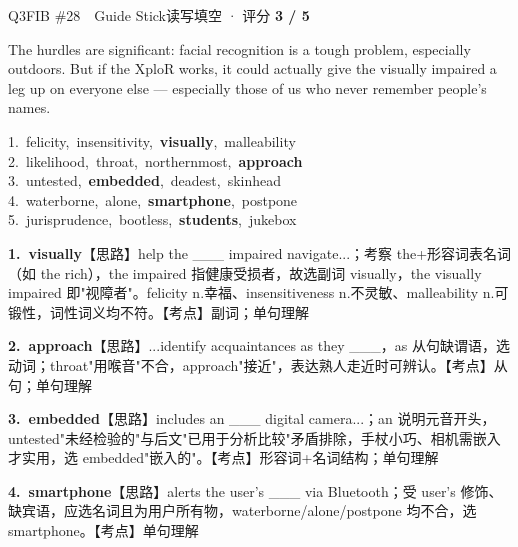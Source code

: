 \begin{qblock}{Q3\quad FIB \#28\ \ Guide Stick}{读写填空 · 评分 \textcolor{cAccent}{\bfseries 3 / 5}}
\begin{promptbox}
The hurdles are significant: facial recognition is a tough problem, especially outdoors. But if the XploR works, it could actually give the visually impaired a leg up on everyone else --- especially those of us who never remember people's names.
\end{promptbox}
{\small
1.\ felicity,\ insensitivity,\ \textbf{visually},\ malleability\\
2.\ likelihood,\ throat,\ northernmost,\ \textbf{approach}\\
3.\ untested,\ \textbf{embedded},\ deadest,\ skinhead\\
4.\ waterborne,\ alone,\ \textbf{smartphone},\ postpone\\
5.\ jurisprudence,\ bootless,\ \textbf{students},\ jukebox}
\begin{notebox}\footnotesize
\textbf{1.\ visually}\quad【思路】help the \_\_\_ impaired navigate...；考察 the+形容词表名词（如 the rich），the impaired 指健康受损者，故选副词 visually，the visually impaired 即"视障者"。felicity n.幸福、insensitiveness n.不灵敏、malleability n.可锻性，词性词义均不符。【考点】副词；单句理解\par\smallskip
\textbf{2.\ approach}\quad【思路】...identify acquaintances as they \_\_\_，as 从句缺谓语，选动词；throat"用喉音"不合，approach"接近"，表达熟人走近时可辨认。【考点】从句；单句理解\par\smallskip
\textbf{3.\ embedded}\quad【思路】includes an \_\_\_ digital camera...；an 说明元音开头，untested"未经检验的"与后文"已用于分析比较"矛盾排除，手杖小巧、相机需嵌入才实用，选 embedded"嵌入的"。【考点】形容词+名词结构；单句理解\par\smallskip
\textbf{4.\ smartphone}\quad【思路】alerts the user's \_\_\_ via Bluetooth；受 user's 修饰、缺宾语，应选名词且为用户所有物，waterborne/alone/postpone 均不合，选 smartphone。【考点】单句理解\par\smallskip

\end{notebox}
\end{qblock}
